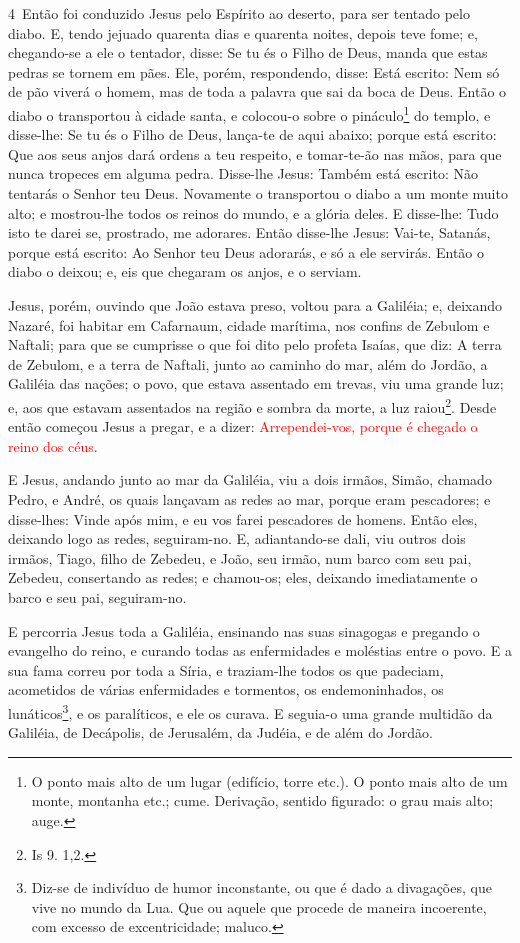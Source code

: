 \medskip

\lettrine{4}\ Então foi conduzido Jesus pelo Espírito ao
deserto, para ser tentado pelo diabo. E, tendo jejuado quarenta
dias e quarenta noites, depois teve fome; e, chegando-se a ele o
tentador, disse: Se tu és o Filho de Deus, manda que estas pedras se
tornem em pães. Ele, porém, respondendo, disse: Está escrito:
Nem só de pão viverá o homem, mas de toda a palavra que sai da boca
de Deus. Então o diabo o transportou à cidade santa, e colocou-o
sobre o pináculo\footnote{O ponto mais alto de um lugar (edifício,
torre etc.). O ponto mais alto de um monte, montanha etc.; cume.
Derivação, sentido figurado: o grau mais alto; auge.} do templo,
e disse-lhe: Se tu és o Filho de Deus, lança-te de aqui abaixo;
porque está escrito: Que aos seus anjos dará ordens a teu respeito,
e tomar-te-ão nas mãos, para que nunca tropeces em alguma pedra.
Disse-lhe Jesus: Também está escrito: Não tentarás o Senhor teu
Deus. Novamente o transportou o diabo a um monte muito alto; e
mostrou-lhe todos os reinos do mundo, e a glória deles. E
disse-lhe: Tudo isto te darei se, prostrado, me adorares.
Então disse-lhe Jesus: Vai-te, Satanás, porque está escrito:
Ao Senhor teu Deus adorarás, e só a ele servirás. Então o
diabo o deixou; e, eis que chegaram os anjos, e o serviam.

Jesus, porém, ouvindo que João estava preso, voltou para a
Galiléia; e, deixando Nazaré, foi habitar em Cafarnaum,
cidade marítima, nos confins de Zebulom e Naftali; para que
se cumprisse o que foi dito pelo profeta Isaías, que diz: A
terra de Zebulom, e a terra de Naftali, junto ao caminho do mar,
além do Jordão, a Galiléia das nações; o povo, que estava
assentado em trevas, viu uma grande luz; e, aos que estavam
assentados na região e sombra da morte, a luz raiou\footnote{Is 9.
1,2.}. Desde então começou Jesus a pregar, e a dizer:
\textcolor{red}{Arrependei-vos, porque é chegado o reino dos céus}.

E Jesus, andando junto ao mar da Galiléia, viu a dois irmãos,
Simão, chamado Pedro, e André, os quais lançavam as redes ao mar,
porque eram pescadores; e disse-lhes: Vinde após mim, e eu
vos farei pescadores de homens. Então eles, deixando logo as
redes, seguiram-no. E, adiantando-se dali, viu outros dois
irmãos, Tiago, filho de Zebedeu, e João, seu irmão, num barco com
seu pai, Zebedeu, consertando as redes; e chamou-os; eles,
deixando imediatamente o barco e seu pai, seguiram-no.

E percorria Jesus toda a Galiléia, ensinando nas suas sinagogas e
pregando o evangelho do reino, e curando todas as enfermidades e
moléstias entre o povo. E a sua fama correu por toda a Síria,
e traziam-lhe todos os que padeciam, acometidos de várias
enfermidades e tormentos, os endemoninhados, os
lunáticos\footnote{Diz-se de indivíduo de humor inconstante, ou que
é dado a divagações, que vive no mundo da Lua. Que ou aquele que
procede de maneira incoerente, com excesso de excentricidade;
maluco.}, e os paralíticos, e ele os curava. E seguia-o uma
grande multidão da Galiléia, de Decápolis, de Jerusalém, da Judéia,
e de além do Jordão.

